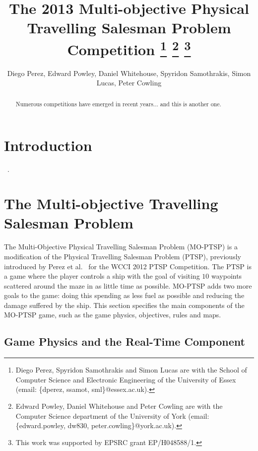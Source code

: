 \documentclass[conference]{IEEEtran}
\begin{document}
\title{The 2013 Multi-objective Physical Travelling Salesman Problem Competition \thanks{Diego Perez, Spyridon Samothrakis and Simon Lucas are with the School of Computer Science and Electronic Engineering of the University of Essex (email: \{dperez, ssamot, sml\}@essex.ac.uk).} \thanks{Edward Powley, Daniel Whitehouse and Peter Cowling are with the Computer Science department of the University of York (email:  \{edward.powley, dw830, peter.cowling\}@york.ac.uk).} \thanks{This work was supported by EPSRC grant EP/H048588/1.}}

\author{Diego Perez, Edward Powley, Daniel Whitehouse, Spyridon Samothrakis, Simon Lucas, Peter Cowling}


\maketitle

\begin{abstract}
Numerous competitions have emerged in recent years... and this is another one.
\end{abstract}


\section{Introduction}

~\cite{PerezCEC2012,MCTSSurvey}.

\section{The Multi-objective Travelling Salesman Problem}

The Multi-Objective Physical Travelling Salesman Problem (MO-PTSP) is a modification of the Physical Travelling Salesman Problem (PTSP), previously introduced by Perez et al.~\cite{PerezCEC2012} for the WCCI 2012 PTSP Competition. The PTSP is a game where the player controls a ship with the goal of visiting $10$ waypoints scattered around the maze in as little time as possible. MO-PTSP adds two more goals to the game: doing this spending as less fuel as possible and reducing the damage suffered by the ship. This section specifies the main components of the MO-PTSP game, such as the game physics, objectives, rules and maps. 

\subsection{Game Physics and the Real-Time Component}
\end{document}
